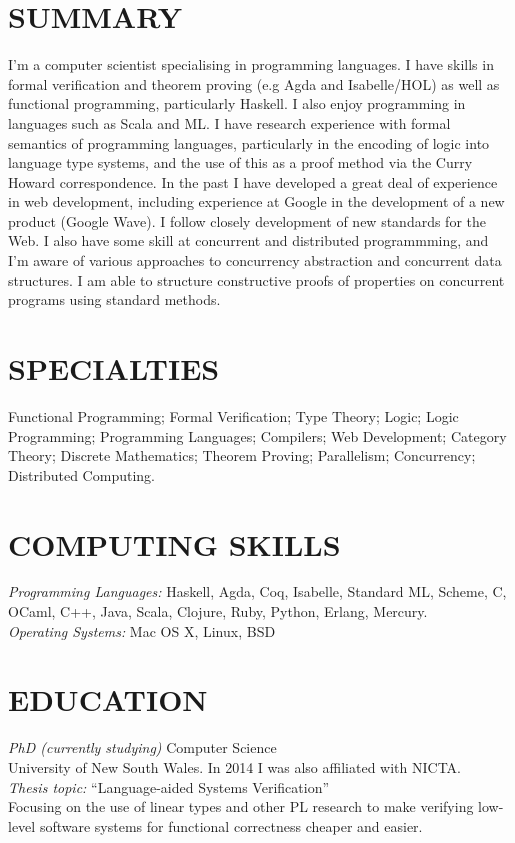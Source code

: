 \documentclass[line,margin]{res}
\begin{document}

 
\begin{resume}
 
\section{SUMMARY}
I'm a computer scientist specialising in programming languages. I have skills in formal verification and theorem proving (e.g Agda and Isabelle/HOL) as well as functional programming, particularly Haskell. I also enjoy programming in languages such as Scala and ML. I have research experience with formal semantics of programming languages, particularly in the encoding of logic into language type systems, and the use of this as a proof method via the Curry Howard correspondence. In the past I have developed a great deal of experience in web development, including experience at Google in the development of a new product (Google Wave). I follow closely development of new standards for the Web. I also have some skill at concurrent and distributed programmming, and I'm aware of various approaches to concurrency abstraction and concurrent data structures. I am able to structure constructive proofs of properties on concurrent programs using standard methods.

\section{SPECIALTIES} Functional Programming; Formal Verification; Type Theory; Logic; Logic Programming; Programming Languages; Compilers; Web Development; Category Theory; Discrete Mathematics; Theorem Proving; Parallelism; Concurrency; Distributed Computing.

\section{COMPUTING SKILLS} {\sl Programming Languages:} Haskell, Agda, Coq, 
         Isabelle, Standard ML, Scheme, C, OCaml, C++, 
         Java, Scala, Clojure, Ruby, Python, 
         Erlang, Mercury. \\
         {\sl Operating Systems:} Mac OS X, Linux, BSD

\section{EDUCATION} 
                {\sl PhD (currently studying)} Computer Science\\
                University of New South Wales. In 2014 I was also affiliated
                with NICTA.
                \\ 
                \emph{Thesis topic:} ``Language-aided Systems Verification'' \\
                Focusing on the use of linear types and other PL research to
                make verifying low-level software systems for functional
                correctness cheaper and easier.


\end{resume}
\end{document}
